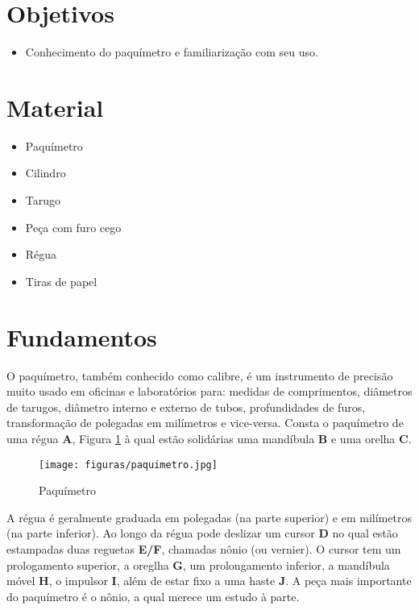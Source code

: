 
\section{Objetivos}

\begin{itemize}
\item Conhecimento do paquímetro e familiarização com seu uso.
\end{itemize}

\section{Material}

\begin{multicols}{2}
\begin{itemize}
\item Paquímetro
\item Cilindro
\item Tarugo
\item Peça com furo cego
\item Régua
\item Tiras de papel
\end{itemize}
\end{multicols}

\section{Fundamentos}
O paquímetro, também conhecido como calibre, é um instrumento de precisão muito usado em oficinas e laboratórios para: medidas de comprimentos, diâmetros de tarugos, diâmetro interno e externo de tubos, profundidades de furos, transformação de polegadas em milímetros e vice-versa. Consta o paquímetro de uma régua \textbf{A}, Figura \ref{fig:paq} à qual estão solidárias uma mandíbula \textbf{B} e uma orelha \textbf{C}.


\begin{figure}[h]
\label{fig:paq}
\texttt{[image: figuras/paquimetro.jpg]} 
\caption{Paquímetro}
\end{figure}

A régua é geralmente graduada em polegadas (na parte superior) e em milímetros (na parte inferior). Ao longo da régua pode deslizar um cursor \textbf{D} no qual estão estampadas duas reguetas \textbf{E/F}, chamadas nônio (ou vernier). O cursor tem um prologamento superior, a oreglha \textbf{G}, um prolongamento inferior, a mandíbula móvel \textbf{H}, o impulsor \textbf{I}, além de estar fixo a uma haste \textbf{J}. A peça mais importante do paquímetro é o nônio, a qual merece um estudo à parte.

